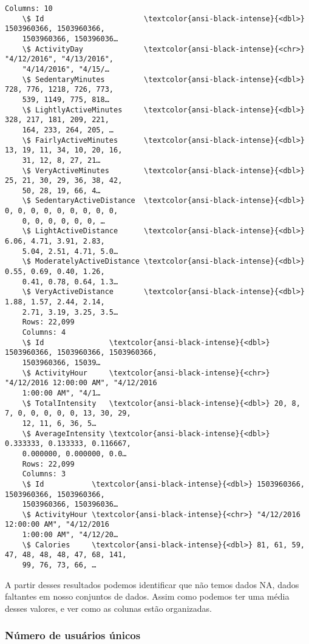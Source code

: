 \documentclass[11pt]{article}
\begin{document}
\begin{Verbatim}[commandchars=\\\{\}]
    Columns: 10
    \$ Id                       \textcolor{ansi-black-intense}{<dbl>} 1503960366, 1503960366,
    1503960366, 150396036…
    \$ ActivityDay              \textcolor{ansi-black-intense}{<chr>} "4/12/2016", "4/13/2016",
    "4/14/2016", "4/15/…
    \$ SedentaryMinutes         \textcolor{ansi-black-intense}{<dbl>} 728, 776, 1218, 726, 773,
    539, 1149, 775, 818…
    \$ LightlyActiveMinutes     \textcolor{ansi-black-intense}{<dbl>} 328, 217, 181, 209, 221,
    164, 233, 264, 205, …
    \$ FairlyActiveMinutes      \textcolor{ansi-black-intense}{<dbl>} 13, 19, 11, 34, 10, 20, 16,
    31, 12, 8, 27, 21…
    \$ VeryActiveMinutes        \textcolor{ansi-black-intense}{<dbl>} 25, 21, 30, 29, 36, 38, 42,
    50, 28, 19, 66, 4…
    \$ SedentaryActiveDistance  \textcolor{ansi-black-intense}{<dbl>} 0, 0, 0, 0, 0, 0, 0, 0, 0,
    0, 0, 0, 0, 0, 0, …
    \$ LightActiveDistance      \textcolor{ansi-black-intense}{<dbl>} 6.06, 4.71, 3.91, 2.83,
    5.04, 2.51, 4.71, 5.0…
    \$ ModeratelyActiveDistance \textcolor{ansi-black-intense}{<dbl>} 0.55, 0.69, 0.40, 1.26,
    0.41, 0.78, 0.64, 1.3…
    \$ VeryActiveDistance       \textcolor{ansi-black-intense}{<dbl>} 1.88, 1.57, 2.44, 2.14,
    2.71, 3.19, 3.25, 3.5…
    Rows: 22,099
    Columns: 4
    \$ Id               \textcolor{ansi-black-intense}{<dbl>} 1503960366, 1503960366, 1503960366,
    1503960366, 15039…
    \$ ActivityHour     \textcolor{ansi-black-intense}{<chr>} "4/12/2016 12:00:00 AM", "4/12/2016
    1:00:00 AM", "4/1…
    \$ TotalIntensity   \textcolor{ansi-black-intense}{<dbl>} 20, 8, 7, 0, 0, 0, 0, 0, 13, 30, 29,
    12, 11, 6, 36, 5…
    \$ AverageIntensity \textcolor{ansi-black-intense}{<dbl>} 0.333333, 0.133333, 0.116667,
    0.000000, 0.000000, 0.0…
    Rows: 22,099
    Columns: 3
    \$ Id           \textcolor{ansi-black-intense}{<dbl>} 1503960366, 1503960366, 1503960366,
    1503960366, 150396036…
    \$ ActivityHour \textcolor{ansi-black-intense}{<chr>} "4/12/2016 12:00:00 AM", "4/12/2016
    1:00:00 AM", "4/12/20…
    \$ Calories     \textcolor{ansi-black-intense}{<dbl>} 81, 61, 59, 47, 48, 48, 48, 47, 68, 141,
    99, 76, 73, 66, …
\end{Verbatim}

A partir desses resultados podemos identificar que não temos dados NA,
dados faltantes em nosso conjuntos de dados. Assim como podemos ter uma
média desses valores, e ver como as colunas estão organizadas.

\hypertarget{nuxfamero-de-usuuxe1rios-uxfanicos}{%
    \subsubsection{Número de usuários
        únicos}\label{nuxfamero-de-usuuxe1rios-uxfanicos}}
\end{document}
